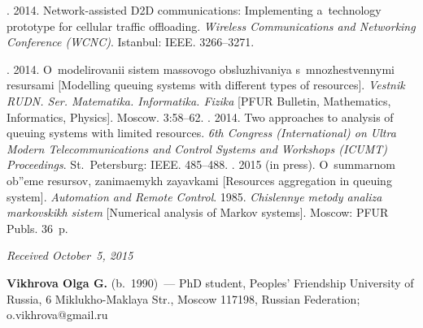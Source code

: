   \begin{multicols}{2}

\renewcommand{\bibname}{\protect\rmfamily References}

{\small\frenchspacing
 {%
 \begin{thebibliography}{9}
 
.  2014. Network-assisted D2D communications: Implementing 
a~technology prototype for cellular traffic offloading. \textit{Wireless 
Communications and Networking Conference (WCNC)}.  Istanbul: IEEE. 3266--3271.

. 2014. O~mo\-de\-li\-rovanii sistem 
massovogo obsluzhivaniya s~mnozhestvennymi resursami [Modelling queuing 
systems with different types of resources]. \textit{Vestnik RUDN. Ser. Matematika. 
Informatika. Fizika} [PFUR Bulletin, Mathematics, Informatics, Physics]. Moscow.  
3:58--62.
. 2014. Two approaches 
to analysis of queuing systems with limited resources. \textit{6th
Congress (International) on Ultra Modern 
Telecommunications and Control Systems and Workshops (ICUMT) Proceedings}.  
St.\ Petersburg: IEEE. 485--488.
. 2015 (in press). 
O~summarnom ob''eme resursov, zanimaemykh zayavkami [Resources aggregation 
in queuing system]. \textit{Automation and Remote Control}.
 1985. \textit{Chislennye metody analiza markovskikh 
sistem} [Numerical analysis of Markov systems]. Moscow: PFUR Publs. 36~p.

\end{thebibliography}

 }
 }

\end{multicols}

\vspace*{-12pt}

\hfill{\small\textit{Received October~5, 2015}}

\Contr

\noindent
\textbf{Vikhrova Olga G.} (b.\ 1990)~--- PhD student, Peoples' Friendship 
University of Russia, 6 Miklukho-Maklaya Str., Moscow 117198, Russian 
Federation; o.vikhrova@gmail.ru

